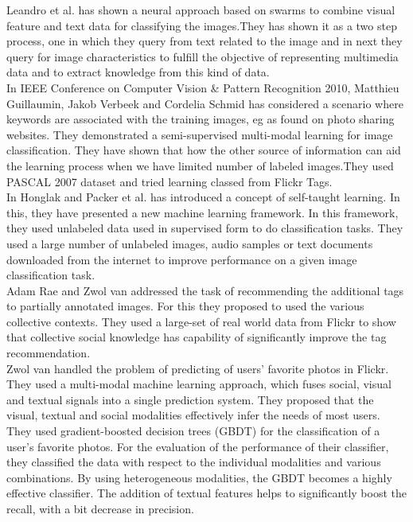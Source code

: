 \hspace*{1cm}  Leandro et al. \cite{silva} has shown a neural approach based on swarms to combine visual feature and text data for classifying the images.They has shown it as a two step process, one in which they query from text related to the image and in next they query for image characteristics to fulfill the objective of representing multimedia data and to extract knowledge from this kind of data.\\
\hspace*{1cm} In IEEE Conference on Computer Vision \& Pattern Recognition 2010, Matthieu Guillaumin, Jakob Verbeek and Cordelia Schmid has considered a scenario where keywords are associated with the training images, eg as found on photo sharing websites. They demonstrated a semi-supervised multi-modal learning for image classification. They have shown that how the other source of information can aid the learning process when we have limited number of labeled images.They used PASCAL 2007 dataset and tried learning classed from Flickr Tags.\\
\hspace*{1cm} In \cite{raina} Honglak and Packer et al. has introduced a concept of self-taught learning. In this, they have presented a new machine learning framework. In this framework, they used unlabeled data used in supervised form to do classification tasks. They used a large number of unlabeled images, audio samples or text documents downloaded from the internet to improve performance on a given image classification task.\\
\hspace*{1cm} Adam Rae and Zwol van \cite{rae} addressed the task of recommending the additional tags to partially annotated images. For this they proposed to used the various collective contexts. They used a large-set of real world data from Flickr to show that collective social knowledge has capability of significantly improve the tag recommendation.\\
\hspace*{1cm} Zwol van \cite{vanZwol} handled the problem of predicting of users' favorite photos in Flickr. They used a multi-modal machine learning approach, which fuses social, visual and textual signals into a single prediction system. They proposed that the  visual, textual and social modalities effectively infer the needs of most users. They used gradient-boosted decision trees (GBDT) for the classification of a user's favorite photos. For the evaluation of the performance of their classifier, they classified the data with respect to the individual modalities and various combinations. By using heterogeneous modalities, the GBDT becomes a highly effective classifier. The addition of textual features helps to  significantly boost the recall, with a bit decrease in precision.\\
